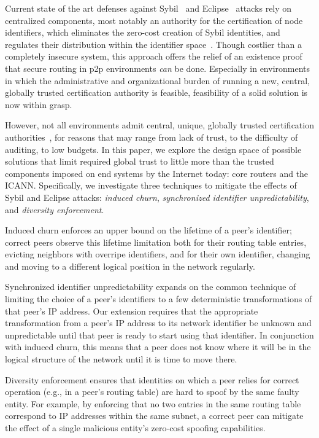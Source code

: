 \documentclass[11pt,twocolumn]{MyTightStyle}
\begin{document}
Current state of the art defenses against Sybil~\cite{Castro2002short}
and Eclipse~\cite{Singh2004short} attacks rely on
centralized components, most notably an authority for the certification
of node identifiers, which eliminates the zero-cost creation of Sybil
identities, and regulates their distribution within the identifier
space~\cite{Castro2002short}.
Though costlier than a completely insecure system, this approach offers
the relief of an existence proof that secure routing in p2p environments
\emph{can} be done.  Especially in environments in which the
administrative and organizational burden of running a
new, central, globally trusted certification authority
is feasible, feasibility of a solid solution is now within grasp.

However, not all environments admit central, unique, globally trusted
certification authorities~\cite{Davis1996short}, for reasons that may
range from lack of trust, to the difficulty of auditing, to low budgets.
In this paper, we explore the design space of possible solutions that
limit required global trust to little more than the trusted components
imposed on end systems by the Internet today: core routers and the
ICANN. Specifically, we investigate three techniques to mitigate the
effects of Sybil and Eclipse attacks: \emph{induced churn},
\emph{synchronized identifier unpredictability}, and \emph{diversity
enforcement}.

Induced churn enforces an upper bound on the lifetime of a peer's
identifier; correct peers observe this lifetime limitation both for
their routing table entries, evicting neighbors with overripe
identifiers, and for their own identifier, changing and moving to a
different logical position in the network regularly.

Synchronized identifier unpredictability expands on the common technique
of limiting the choice of a peer's identifiers to a few deterministic
transformations of that peer's IP address.  Our extension requires that
the appropriate transformation from a peer's IP address to its network
identifier be unknown and unpredictable until that peer is ready to
start using that identifier.  In conjunction with induced churn, this
means that a peer does not know where it will be in the logical
structure of the network until it is time to move there.

Diversity enforcement ensures that identities on which a peer relies for
correct operation (e.g., in a peer's routing table)
are hard to spoof by the same faulty entity.  For example, by enforcing
that no two
entries in the same routing table correspond to IP addresses within the
same subnet, a correct peer can mitigate the effect of a single
malicious entity's zero-cost
spoofing capabilities.
\end{document}
